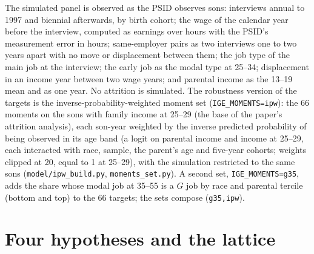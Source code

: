 \documentclass[11pt]{article}
\newcommand{\code}[1]{\texttt{#1}}
\newcommand{\1}{\mathbf{1}}
\begin{document}
The simulated panel is observed as the PSID observes sons: interviews annual to 1997 and biennial afterwards, by birth
cohort; the wage of the calendar year before the interview, computed as earnings over hours with the PSID's measurement
error in hours; same-employer pairs as two interviews one to two years apart with no move or displacement between them;
the job type of the main job at the interview; the early job as the modal type at 25--34; displacement in an income year
between two wage years; and parental income as the 13--19 mean and as one year. No attrition is simulated. The
robustness version of the targets is the inverse-probability-weighted moment set (\code{IGE\_MOMENTS=ipw}): the 66
moments on the sons with family income at 25--29 (the base of the paper's attrition analysis), each son-year weighted by
the inverse predicted probability of being observed in its age band (a logit on parental income and income at 25--29,
each interacted with race, sample, the parent's age and five-year cohorts; weights clipped at 20, equal to 1 at 25--29),
with the simulation restricted to the same sons (\code{model/ipw\_build.py}, \code{moments\_set.py}). A second set,
\code{IGE\_MOMENTS=g35}, adds the share whose modal job at 35--55 is a $G$ job by race and parental tercile (bottom and
top) to the 66 targets; the sets compose (\code{g35,ipw}).

\section{Four hypotheses and the lattice}\label{sec:nested}
\end{document}
